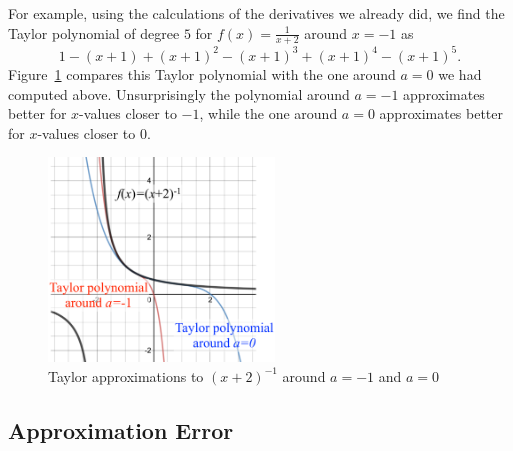 For example, using the calculations of the derivatives we already did, 
we find the Taylor
polynomial of degree $5$ for $f(x)=\frac{1}{x+2}$ around $x=-1$ as
\[
1-(x+1)+(x+1)^2-(x+1)^3+(x+1)^4-(x+1)^5.
\]
Figure~\ref{figtayoneoplus} compares this Taylor polynomial with the one
around $a=0$ we had computed above. Unsurprisingly the polynomial around
$a=-1$ approximates better for $x$-values closer to $-1$, while the one
around $a=0$ approximates better for $x$-values closer to $0$.
\begin{figure}
\begin{center}
\includegraphics[width=6cm]{pic/TaylorOneOverxP2Plus.pdf}
\end{center}
\caption{Taylor approximations to $(x+2)^{-1}$ around $a=-1$ and $a=0$}
\label{figtayoneoplus}
\end{figure}

\subsection{Approximation Error}


